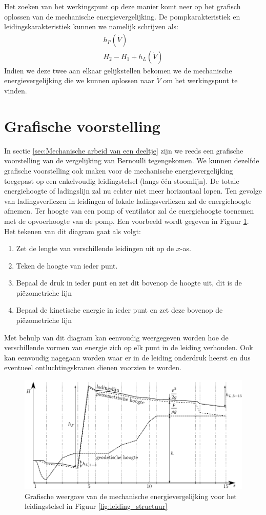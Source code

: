 Het zoeken van het werkingspunt op deze manier komt neer op het grafisch oplossen van de mechanische energievergelijking. De pompkarakteristiek en leidingskarakteristiek kunnen we namelijk schrijven als:
\begin{align}
	h_P(\dot{V}) \\
	H_2-H_1 + h_L(\dot{V})
\end{align}
Indien we deze twee aan elkaar gelijkstellen bekomen we de mechanische energievergelijking die we kunnen oplossen naar $\dot{V}$ om het werkingspunt te vinden.

		\section{Grafische voorstelling}
In sectie \ref{sec:Mechanische arbeid van een deeltje} zijn we reeds een grafische voorstelling van de vergelijking van Bernoulli tegengekomen. We kunnen dezelfde grafische voorstelling ook maken voor de mechanische energievergelijking toegepast op een enkelvoudig leidingstelsel (langs één stoomlijn). De totale energiehoogte of ladingslijn zal nu echter niet meer horizontaal lopen. Ten gevolge van ladingsverliezen in leidingen of lokale ladingsverliezen zal de energiehoogte afnemen. Ter hoogte van een pomp of ventilator zal de energiehoogte toenemen met de opvoerhoogte van de pomp. Een voorbeeld wordt gegeven in Figuur \ref{fig:leidingstelsel_energiehoogte}. Het tekenen van dit diagram gaat als volgt:
\begin{enumerate}
	\item Zet de lengte van verschillende leidingen uit op de $x$-as.
	\item Teken de hoogte van ieder punt.
	\item Bepaal de druk in ieder punt en zet dit bovenop de hoogte uit, dit is de piëzometriche lijn
	\item Bepaal de kinetische energie in ieder punt en zet deze bovenop de piëzometriche lijn
\end{enumerate}
Met behulp van dit diagram kan eenvoudig weergegeven worden hoe de verschillende vormen van energie zich op elk punt in de leiding verhouden. Ook kan eenvoudig nagegaan worden waar er in de leiding onderdruk heerst en dus eventueel ontluchtingskranen dienen voorzien te worden.
\begin{figure}
	\centering
	\includegraphics{fig/leidingstelsels/leidingstelsel_energiehoogte}
	\caption{Grafische weergave van de mechanische energievergelijking voor het leidingstelsel in Figuur \ref{fig:leiding_structuur}}
	\label{fig:leidingstelsel_energiehoogte}
\end{figure}


